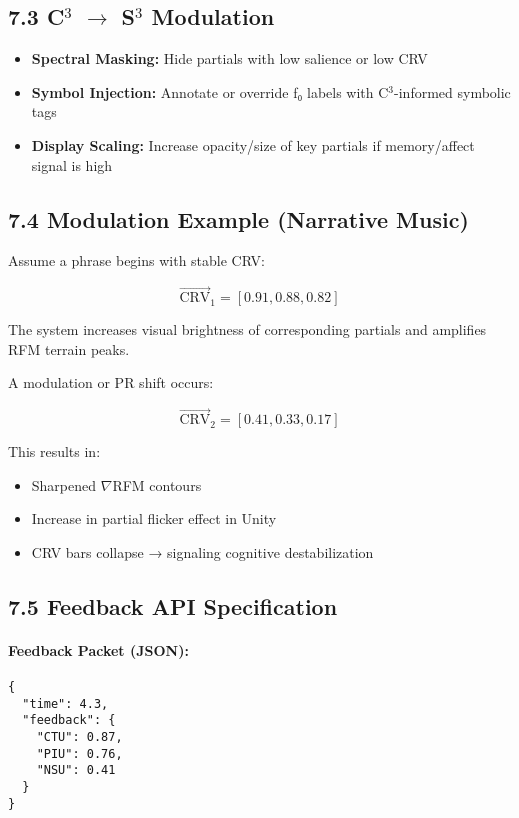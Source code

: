 \documentclass[10pt]{article}
\begin{document}
\subsection*{7.3 C$^3$ $\rightarrow$ S$^3$ Modulation}

\begin{itemize}
    \item \textbf{Spectral Masking:} Hide partials with low salience or low CRV
    \item \textbf{Symbol Injection:} Annotate or override f₀ labels with C$^3$-informed symbolic tags
    \item \textbf{Display Scaling:} Increase opacity/size of key partials if memory/affect signal is high
\end{itemize}

\subsection*{7.4 Modulation Example (Narrative Music)}

Assume a phrase begins with stable CRV:

\[
\vec{\text{CRV}}_1 = [0.91, 0.88, 0.82]
\]

The system increases visual brightness of corresponding partials and amplifies RFM terrain peaks.

A modulation or PR shift occurs:

\[
\vec{\text{CRV}}_2 = [0.41, 0.33, 0.17]
\]

This results in:
\begin{itemize}
    \item Sharpened $\nabla$RFM contours
    \item Increase in partial flicker effect in Unity
    \item CRV bars collapse → signaling cognitive destabilization
\end{itemize}

\subsection*{7.5 Feedback API Specification}

\paragraph{Feedback Packet (JSON):}

\begin{verbatim}
{
  "time": 4.3,
  "feedback": {
    "CTU": 0.87,
    "PIU": 0.76,
    "NSU": 0.41
  }
}
\end{verbatim}
\end{document}
